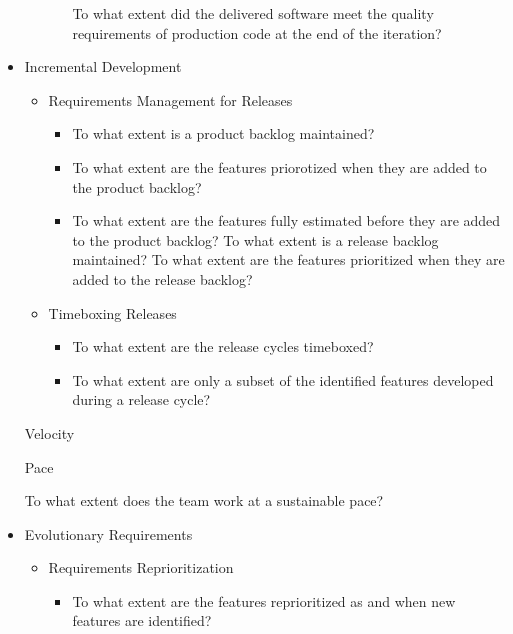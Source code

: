 \begin{appendices}
\begin{itemize}
\begin{itemize}
\begin{itemize}
					\addition To what extent did the delivered software meet the quality requirements of production code at the end of the iteration?
				\end{itemize}
		\end{itemize}
	\item Incremental Development
		\begin{itemize}
			\item Requirements Management for Releases
				\begin{itemize}
					\item To what extent is a product backlog maintained?
					\item To what extent are the features priorotized when they are added to the product backlog?
					\item To what extent are the features fully estimated before they are added to the product backlog?
					\addition To what extent is a release backlog maintained?
					\addition To what extent are the features prioritized when they are added to the release backlog?
				\end{itemize}
			\item Timeboxing Releases
				\begin{itemize}
					\item To what extent are the release cycles timeboxed?
					\item To what extent are only a subset of the identified features developed during a release cycle?
				\end{itemize}
		\end{itemize}
	\addition Velocity
		\begin{itemize}
			\addition Pace
				\begin{itemize}
					\addition To what extent does the team work at a sustainable pace?
				\end{itemize}
		\end{itemize}
	\item Evolutionary Requirements
		\begin{itemize}
			\item Requirements Reprioritization 
				\begin{itemize}
					\item To what extent are the features reprioritized as and when new features are identified?

\end{itemize}
\end{itemize}
\end{itemize}
\end{appendices}
